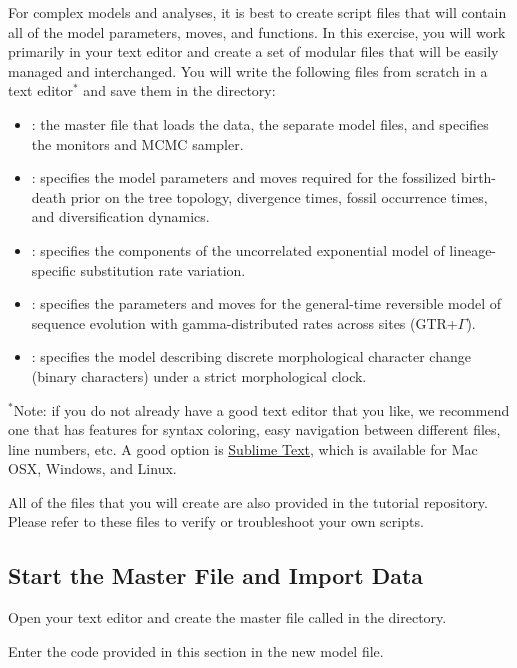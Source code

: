 For complex models and analyses, it is best to create \Rev script files that will contain all of the model parameters, moves, and functions. 
In this exercise, you will work primarily in your text editor and create a set of modular files that will be easily managed and interchanged.
You will write the following files from scratch in a text editor$^*$ and save them in the  directory:
\begin{itemize}[noitemsep,topsep=0pt]
\item {}: the master \Rev file that loads the data, the separate model files, and specifies the monitors and MCMC sampler.
\item {}: specifies the model parameters and moves required for the fossilized birth-death prior on the tree topology, divergence times, fossil occurrence times, and diversification dynamics.
\item {}: specifies the components of the uncorrelated exponential model of lineage-specific substitution rate variation.
\item {}: specifies the parameters and moves for the general-time reversible model of sequence evolution with gamma-distributed rates across sites (GTR+$\Gamma$).
\item {}: specifies the model describing discrete morphological character change (binary characters) under a strict morphological clock. 
\end{itemize}
{\footnotesize $^*$Note: if you do not already have a good text editor that you like, we recommend one that has features for syntax coloring, easy navigation between different files, line numbers, etc.
A good option is \href{http://www.sublimetext.com/}{Sublime Text}, which is available for Mac OSX, Windows, and Linux.}

All of the files that you will create are also provided in the \RevBayes tutorial repository. 
Please refer to these files to verify or troubleshoot your own scripts. 


\bigskip
\subsection{Start the Master \Rev File and Import Data}\label{subsect:RB-StartMasterRev}



{\begin{framed}
Open your text editor and create the master \Rev file called {\textcolor{red}{}} in the  directory.

Enter the \Rev code provided in this section in the new model file.
\end{framed}}

